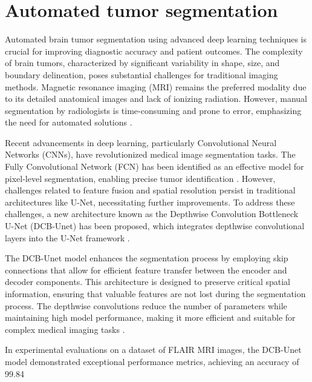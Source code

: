 \documentclass[runningheads]{llncs}
\begin{document}
\section{Automated tumor segmentation}
Automated brain tumor segmentation using advanced deep learning techniques is crucial for improving diagnostic accuracy and patient outcomes. The complexity of brain tumors, characterized by significant variability in shape, size, and boundary delineation, poses substantial challenges for traditional imaging methods. Magnetic resonance imaging (MRI) remains the preferred modality due to its detailed anatomical images and lack of ionizing radiation. However, manual segmentation by radiologists is time-consuming and prone to error, emphasizing the need for automated solutions \cite{Akter_2024, Havaei_2017, Daimary_2020}.

Recent advancements in deep learning, particularly Convolutional Neural Networks (CNNs), have revolutionized medical image segmentation tasks. The Fully Convolutional Network (FCN) has been identified as an effective model for pixel-level segmentation, enabling precise tumor identification \cite{Ronneberger_2015, Chen_2018}. However, challenges related to feature fusion and spatial resolution persist in traditional architectures like U-Net, necessitating further improvements. To address these challenges, a new architecture known as the Depthwise Convolution Bottleneck U-Net (DCB-Unet) has been proposed, which integrates depthwise convolutional layers into the U-Net framework \cite{Kumar_2023, Havaei_2017}.

The DCB-Unet model enhances the segmentation process by employing skip connections that allow for efficient feature transfer between the encoder and decoder components. This architecture is designed to preserve critical spatial information, ensuring that valuable features are not lost during the segmentation process. The depthwise convolutions reduce the number of parameters while maintaining high model performance, making it more efficient and suitable for complex medical imaging tasks \cite{Akter_2024, Ding_2019}.

In experimental evaluations on a dataset of FLAIR MRI images, the DCB-Unet model demonstrated exceptional performance metrics, achieving an accuracy of 99.84%
\end{document}
